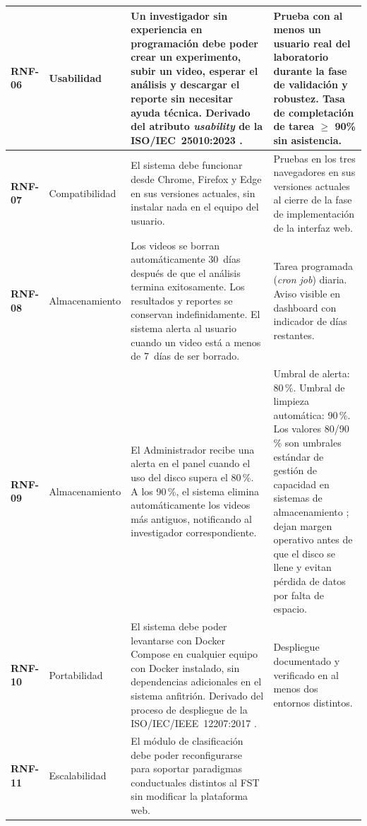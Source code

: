\begin{longtable}{|>{\bfseries}p{1.1cm}|p{1.8cm}|p{5.9cm}|p{4.3cm}|}
\hline
RNF-06 & Usabilidad
       & Un investigador sin experiencia en programación debe poder crear un
         experimento, subir un video, esperar el análisis y descargar el reporte
         sin necesitar ayuda técnica. Derivado del atributo \textit{usability} de
         la ISO/IEC~25010:2023 \cite{iso25010}.
       & Prueba con al menos un usuario real del laboratorio durante la fase de
         validación y robustez. Tasa de completación de tarea $\geq$ 90\% sin
         asistencia. \\
\hline
RNF-07 & Compatibilidad
       & El sistema debe funcionar desde Chrome, Firefox y Edge en sus versiones
         actuales, sin instalar nada en el equipo del usuario.
       & Pruebas en los tres navegadores en sus versiones actuales al cierre de
         la fase de implementación de la interfaz web. \\
\hline
RNF-08 & Almacenamiento
       & Los videos se borran automáticamente 30~días después de que el análisis
         termina exitosamente. Los resultados y reportes se conservan
         indefinidamente. El sistema alerta al usuario cuando un video está a menos
         de 7~días de ser borrado.
       & Tarea programada (\textit{cron job}) diaria. Aviso visible en dashboard
         con indicador de días restantes. \\
\hline
RNF-09 & Almacenamiento
       & El Administrador recibe una alerta en el panel cuando el uso del disco
         supera el 80\,\%. A los 90\,\%, el sistema elimina automáticamente los
         videos más antiguos, notificando al investigador correspondiente.
       & Umbral de alerta: 80\,\%. Umbral de limpieza automática: 90\,\%.
         Los valores 80/90\,\% son umbrales estándar de gestión de capacidad
         en sistemas de almacenamiento \cite{pressman2014}; dejan margen
         operativo antes de que el disco se llene y evitan pérdida de datos
         por falta de espacio. \\
\hline
RNF-10 & Portabilidad
       & El sistema debe poder levantarse con Docker Compose en cualquier equipo
         con Docker instalado, sin dependencias adicionales en el sistema anfitrión.
         Derivado del proceso de despliegue de la ISO/IEC/IEEE~12207:2017
         \cite{iso12207}.
       & Despliegue documentado y verificado en al menos dos entornos distintos. \\
\hline
RNF-11 & Escalabilidad
       & El módulo de clasificación debe poder reconfigurarse para soportar
         paradigmas conductuales distintos al FST sin modificar la plataforma web.

\end{longtable}
